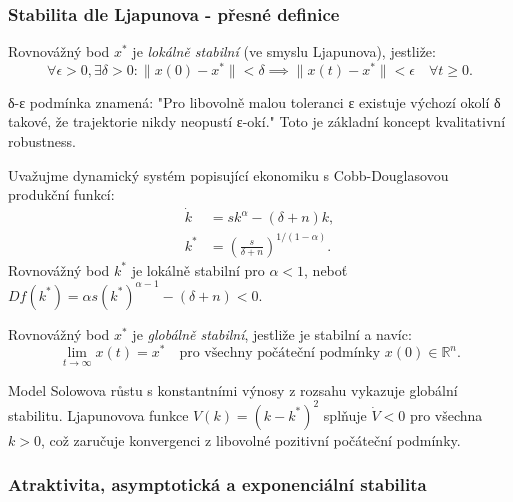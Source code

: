 \subsubsection{Stabilita dle Ljapunova - přesné definice}

\begin{definition}
Rovnovážný bod $x^*$ je \emph{lokálně stabilní} (ve smyslu Ljapunova), jestliže:
\[
\forall \epsilon > 0, \exists \delta > 0: \|x(0) - x^*\| < \delta \implies \|x(t) - x^*\| < \epsilon \quad \forall t \geq 0.
\]
\end{definition}

\begin{intuition}
δ-ε podmínka znamená: "Pro libovolně malou toleranci ε existuje výchozí okolí δ takové, že trajektorie nikdy neopustí ε-okí." Toto je základní koncept kvalitativní robustness.
\end{intuition}

\begin{example}
Uvažujme dynamický systém popisující ekonomiku s Cobb-Douglasovou produkční funkcí:
\begin{align*}
\dot{k} &= s k^\alpha - (\delta + n)k, \\
k^* &= \left(\frac{s}{\delta + n}\right)^{1/(1-\alpha)}.
\end{align*}
Rovnovážný bod $k^*$ je lokálně stabilní pro $\alpha < 1$, neboť $Df(k^*) = \alpha s (k^*)^{\alpha-1} - (\delta + n) < 0$.
\end{example}

\begin{definition}
Rovnovážný bod $x^*$ je \emph{globálně stabilní}, jestliže je stabilní a navíc:
\[
\lim_{t \to \infty} x(t) = x^* \quad \text{pro všechny počáteční podmínky } x(0) \in \mathbb{R}^n.
\]
\end{definition}

\begin{example}
Model Solowova růstu s konstantními výnosy z rozsahu vykazuje globální stabilitu. Ljapunovova funkce $V(k) = (k - k^*)^2$ splňuje $\dot{V} < 0$ pro všechna $k > 0$, což zaručuje konvergenci z libovolné pozitivní počáteční podmínky.
\end{example}

\subsubsection{Atraktivita, asymptotická a exponenciální stabilita}

